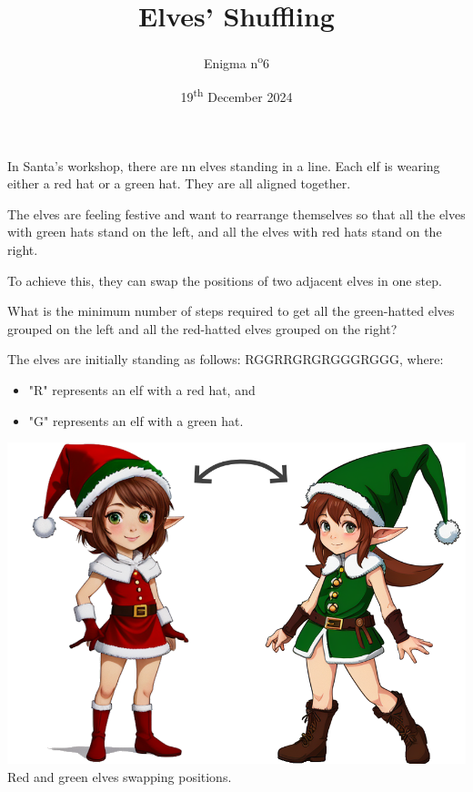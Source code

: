 \documentclass[a4paper, top=10mm]{article}
\title{\textbf{\huge{Elves' Shuffling}}}
\author{Enigma n\textsuperscript{o}6}
\date{19\textsuperscript{th} December 2024}
\begin{document}
	\maketitle
	
	In Santa’s workshop, there are nn elves standing in a line. Each elf is wearing either a red hat or a green hat. They are all aligned together.
	
	The elves are feeling festive and want to rearrange themselves so that all the elves with green hats stand on the left, and all the elves with red hats stand on the right.
	
	To achieve this, they can swap the positions of two adjacent elves in one step.
	
	What is the minimum number of steps required to get all the green-hatted elves grouped on the left and all the red-hatted elves grouped on the right?
	
	The elves are initially standing as follows: RGGRRGRGRGGGRGGG, where:
	\begin{itemize}
		\item "R" represents an elf with a red hat, and
		\item "G" represents an elf with a green hat.
	\end{itemize}
	
	\begin{center}
		\includegraphics[width=\linewidth]{06elves.png}\\
		Red and green elves swapping positions.
	\end{center}
	
	
\end{document}
